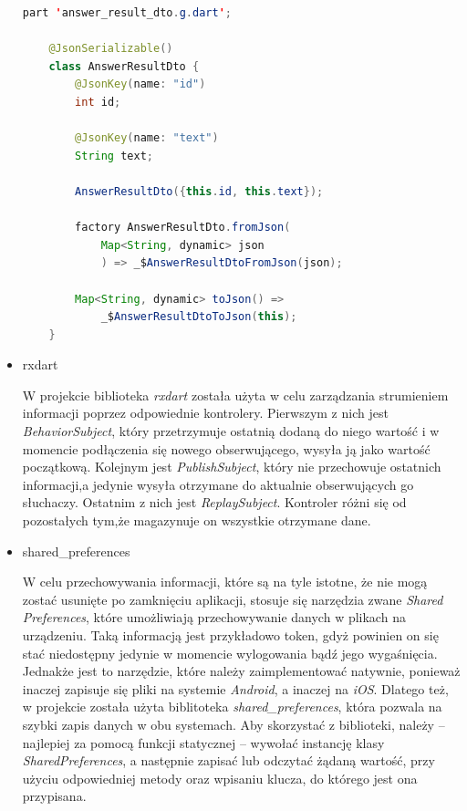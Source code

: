 \documentclass[twoside]{projektInzynierskiMS}
\numberwithin{figure}{section}
\begin{document}
\begin{itemize}
\begin{lstlisting}[language=Java,caption=Przykład implementacji serializacji danych typu JSON. Źródło: Opracowanie własne.,captionpos=b]
    part 'answer_result_dto.g.dart';
    
    @JsonSerializable()
    class AnswerResultDto {
        @JsonKey(name: "id")
        int id;

        @JsonKey(name: "text")
        String text;

        AnswerResultDto({this.id, this.text});

        factory AnswerResultDto.fromJson(
            Map<String, dynamic> json
            ) => _$AnswerResultDtoFromJson(json);

        Map<String, dynamic> toJson() => 
            _$AnswerResultDtoToJson(this);
    }
\end{lstlisting}

    \item rxdart
    
    W projekcie biblioteka \textit{rxdart} została użyta w celu zarządzania strumieniem informacji poprzez odpowiednie kontrolery. Pierwszym z nich jest \textit{BehaviorSubject}, który przetrzymuje ostatnią dodaną do niego wartość i w momencie podłączenia się nowego obserwującego, wysyła ją jako wartość początkową. Kolejnym jest \textit{PublishSubject}, który nie przechowuje ostatnich informacji,\linebreak a jedynie wysyła otrzymane do aktualnie obserwujących go słuchaczy. Ostatnim z nich jest \textit{ReplaySubject}. Kontroler różni się od pozostałych tym,\linebreak że magazynuje on wszystkie otrzymane dane.
    \newline
    \item shared\_preferences
    
    W celu przechowywania informacji, które są na tyle istotne, że nie mogą zostać usunięte po zamknięciu aplikacji, stosuje się narzędzia zwane \textit{Shared Preferences}, które umożliwiają przechowywanie danych w plikach na urządzeniu. Taką informacją jest przykładowo token, gdyż powinien on się stać niedostępny jedynie w momencie wylogowania bądź jego wygaśnięcia. Jednakże jest to narzędzie, które należy zaimplementować natywnie, ponieważ inaczej zapisuje się pliki na systemie \textit{Android}, a inaczej na \textit{iOS}. Dlatego też, w projekcie została użyta biblitoteka \textit{shared\_preferences}, która pozwala na szybki zapis danych w obu systemach. Aby skorzystać z biblioteki, należy – najlepiej za pomocą funkcji statycznej -- wywołać instancję klasy \textit{SharedPreferences}, a następnie zapisać lub odczytać żądaną wartość, przy użyciu odpowiedniej metody oraz wpisaniu klucza, do którego jest ona przypisana. 
    

\end{itemize}
\end{document}
